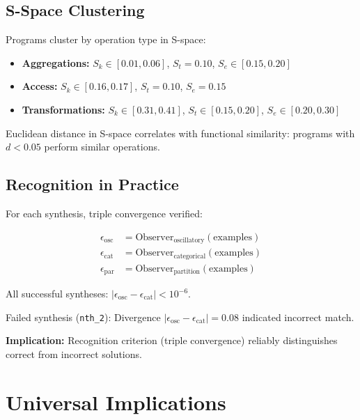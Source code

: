 \documentclass[twocolumn,10pt]{article}
\theoremstyle{definition}
\theoremstyle{remark}
\newcommand{\Sk}{S_k}
\newcommand{\St}{S_t}
\newcommand{\Se}{S_e}
\begin{document}
\subsection{S-Space Clustering}

Programs cluster by operation type in S-space:

\begin{itemize}
\item \textbf{Aggregations:} $\Sk \in [0.01, 0.06]$, $\St = 0.10$, $\Se \in [0.15, 0.20]$
\item \textbf{Access:} $\Sk \in [0.16, 0.17]$, $\St = 0.10$, $\Se = 0.15$
\item \textbf{Transformations:} $\Sk \in [0.31, 0.41]$, $\St \in [0.15, 0.20]$, $\Se \in [0.20, 0.30]$
\end{itemize}

Euclidean distance in S-space correlates with functional similarity: programs with $d < 0.05$ perform similar operations.

\subsection{Recognition in Practice}

For each synthesis, triple convergence verified:

\begin{equation}
\begin{aligned}
\epsilon_{\text{osc}} &= \text{Observer}_{\text{oscillatory}}(\text{examples}) \\
\epsilon_{\text{cat}} &= \text{Observer}_{\text{categorical}}(\text{examples}) \\
\epsilon_{\text{par}} &= \text{Observer}_{\text{partition}}(\text{examples})
\end{aligned}
\end{equation}

All successful syntheses: $|\epsilon_{\text{osc}} - \epsilon_{\text{cat}}| < 10^{-6}$.

Failed synthesis (\texttt{nth\_2}): Divergence $|\epsilon_{\text{osc}} - \epsilon_{\text{cat}}| = 0.08$ indicated incorrect match.

\vspace{0.2cm}
\noindent\textbf{Implication:} Recognition criterion (triple convergence) reliably distinguishes correct from incorrect solutions.

\section{Universal Implications}
\label{sec:implications}
\end{document}
